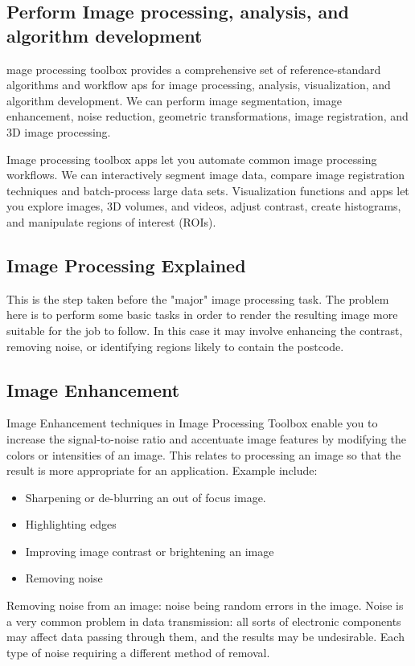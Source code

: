 \documentclass[a4paper,10pt]{article}
\begin{document}
\subsection{Perform Image processing, analysis, and algorithm development}
mage processing toolbox provides a comprehensive set of reference-standard algorithms and workflow aps for image processing, analysis, visualization, and algorithm development. We can perform image segmentation, image enhancement, noise reduction, geometric transformations, image registration, and 3D image processing.

Image processing toolbox apps let you automate common image processing workflows. We can interactively segment image data, compare image registration techniques and batch-process large data sets. Visualization functions and apps let you explore images, 3D volumes, and videos, adjust contrast, create histograms, and manipulate regions of interest (ROIs).
\subsection{Image Processing Explained}
This is the step taken before the "major" image processing task. The problem here is to perform some basic tasks in order to render the resulting image more suitable for the job to follow. In this case it may involve enhancing the contrast, removing noise, or identifying regions likely to contain the postcode.
\subsection{Image Enhancement}
Image Enhancement techniques in Image Processing Toolbox enable you to increase the signal-to-noise ratio and accentuate image features by modifying the colors or intensities of an image. 
This relates to processing an image so that the result is more appropriate for an application. Example include:
\begin{itemize}
\item Sharpening or de-blurring an out of focus image.
\item Highlighting edges
\item Improving image contrast or brightening an image
\item Removing noise
\end{itemize}
Removing noise from an image: noise being random errors in the image. Noise is a very common problem in data transmission: all sorts of electronic components may affect data passing through them, and the results may be undesirable. Each type of noise requiring a different method of removal.
\end{document}
